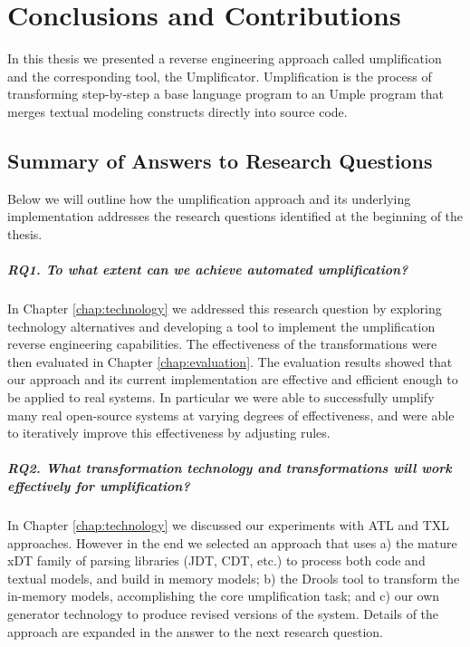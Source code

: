 \lhead{\emph{\leftmark}}  %
\chapter{Conclusions and Contributions}
\label{chap:conclusion}
In this thesis we presented a reverse engineering approach called umplification and the corresponding tool, the Umplificator. Umplification is the process of transforming step-by-step a base language program to an Umple program that merges textual modeling constructs directly into source code. 

\section{Summary of Answers to Research Questions}

Below we will outline how the umplification approach and its underlying implementation addresses the  research questions identified at the beginning of the thesis.

\paragraph*{RQ1. To what extent can we achieve automated umplification?}

In Chapter \ref{chap:technology} we addressed this research question by exploring technology alternatives and developing a tool to implement the umplification reverse engineering capabilities. The effectiveness of the transformations were then evaluated in Chapter \ref{chap:evaluation}. The evaluation results showed that our approach and its current implementation are effective and efficient enough to be applied to real systems. In particular we were able to successfully umplify many real open-source systems at varying degrees of effectiveness, and were able to iteratively improve this effectiveness by adjusting rules.
 
\paragraph*{RQ2. What transformation technology and transformations  will work effectively for umplification?}

In Chapter \ref{chap:technology}  we discussed our experiments with ATL and TXL approaches. However in the end we selected an approach that uses a) the mature xDT family of parsing libraries (JDT, CDT, etc.) to process both code and textual models, and build in memory models; b) the Drools tool to transform the in-memory models, accomplishing the core umplification task; and c) our own generator technology to produce revised versions of the system. Details of the approach are expanded in the answer to the next research question.

